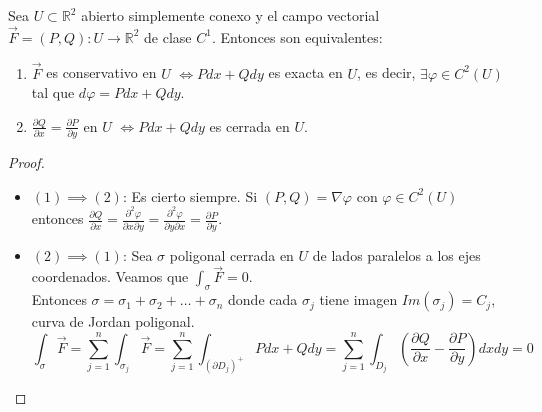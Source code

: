 
\begin{corolario}
    Sea $U \subset \mathbb{R}^2$ abierto simplemente conexo y el campo vectorial $\vec{F} = (P, Q): U \to \mathbb{R}^2$ de clase $C^1$. Entonces son equivalentes:
    \begin{enumerate}
        \item $\vec{F}$ es conservativo en $U$ $\iff Pdx + Qdy$ es exacta en $U$, es decir, $\exists \varphi \in C^2(U)$ tal que $d\varphi = Pdx + Qdy$.
        \item $\frac{\partial Q}{\partial x} = \frac{\partial P}{\partial y}$ en $U$ $\iff Pdx + Qdy$ es cerrada en $U$.
    \end{enumerate}
\end{corolario}

\begin{proof}
    \leavevmode
\begin{itemize}
    \item $(1) \implies (2)$: Es cierto siempre. Si $(P, Q) = \nabla \varphi$ con $\varphi \in C^2(U)$ entonces $\frac{\partial Q}{\partial x} = \frac{\partial ^2 \varphi}{\partial x \partial y} = \frac{\partial ^2 \varphi}{\partial y \partial x} = \frac{\partial P}{\partial y}$.
    \item $(2) \implies (1)$: Sea $\sigma$ poligonal cerrada en $U$ de lados paralelos a los ejes coordenados. Veamos que $\int_{\sigma} \vec{F} = 0$.\\
    Entonces $\sigma = \sigma_1 + \sigma_2 + \ldots + \sigma_n$ donde cada $\sigma_j$ tiene imagen $Im(\sigma_j) = C_j$, curva de Jordan poligonal.
    $$  \int_{\sigma} \vec{F} = \sum_{j=1}^{n} \int_{\sigma_j} \vec{F} = \sum_{j=1}^{n} \int_{(\partial D_j)^+} Pdx + Qdy = \sum_{j=1}^{n} \int_{D_j} \left( \frac{\partial Q}{\partial x} - \frac{\partial P}{\partial y} \right) dx dy = 0$$
    
\end{itemize}
\end{proof}

